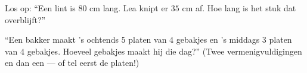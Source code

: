 \begin{exercise}[$\star$]\label{exo:g2:problems:9}
Los op: ``Een lint is $80$ cm lang. Lea knipt er $35$ cm af. Hoe lang
is het stuk dat overblijft?''
\end{exercise}

\begin{exercise}[$\star\star$]\label{exo:g2:problems:10}
``Een bakker maakt 's ochtends $5$ platen van $4$ gebakjes en 's
middags $3$ platen van $4$ gebakjes. Hoeveel gebakjes maakt hij die
dag?'' (Twee vermenigvuldigingen en dan een  --- of tel eerst de
platen!)
\end{exercise}
